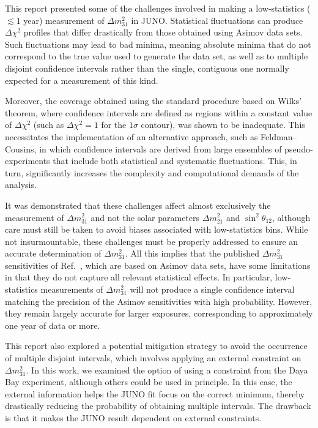 This report presented some of the challenges involved in making a low-statistics ($\lesssim 1$ year) measurement of $\Delta m^2_{31}$ in JUNO. Statistical fluctuations can produce $\Delta\chi^2$ profiles that differ drastically from those obtained using Asimov data sets. Such fluctuations may lead to bad minima, meaning absolute minima that do not correspond to the true value used to generate the data set, as well as to multiple disjoint confidence intervals rather than the single, contiguous one normally expected for a measurement of this kind.

Moreover, the coverage obtained using the standard procedure based on Wilks' theorem, where confidence intervals are defined as regions within a constant value of $\Delta \chi^2$ (such as $\Delta \chi^2=1$ for the $1\sigma$ contour), was shown to be inadequate. This necessitates the implementation of an alternative approach, such as Feldman–Cousins, in which confidence intervals are derived from large ensembles of pseudo-experiments that include both statistical and systematic fluctuations. This, in turn, significantly increases the complexity and computational demands of the analysis.

It was demonstrated that these challenges affect almost exclusively the measurement of $\Delta m^2_{31}$ and not the solar parameters $\Delta m^2_{21}$ and $\sin^2\theta_{12}$, although care must still be taken to avoid biases associated with low-statistics bins. While not insurmountable, these challenges must be properly addressed to ensure an accurate determination of $\Delta m^2_{31}$. All this implies that the published $\Delta m^2_{31}$ sensitivities of Ref.~\cite{JUNO:2022osc}, which are based on Asimov data sets, have some limitations in that they do not capture all relevant statistical effects. In particular, low-statistics measurements of $\Delta m^2_{31}$ will not produce a single confidence interval matching the precision of the Asimov sensitivities with high probability. However, they remain largely accurate for larger exposures, corresponding to approximately one year of data or more.

This report also explored a potential mitigation strategy to avoid the occurrence of multiple disjoint intervals, which involves applying an external constraint on $\Delta m^2_{31}$. In this work, we examined the option of using a constraint from the Daya Bay experiment, although others could be used in principle. In this case, the external information helps the JUNO fit focus on the correct minimum, thereby drastically reducing the probability of obtaining multiple intervals. The drawback is that it makes the JUNO result dependent on external constraints.

